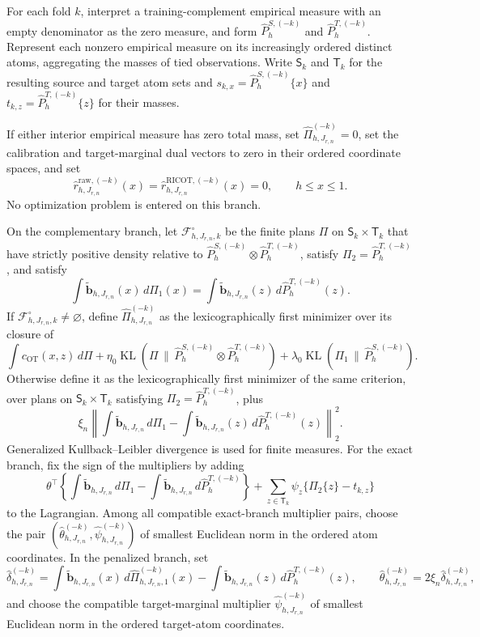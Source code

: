 For each fold \(k\), interpret a training-complement empirical measure with an empty denominator as the zero measure, and form \(\widehat P^{S,(-k)}_h\) and \(\widehat P^{T,(-k)}_h\). Represent each nonzero empirical measure on its increasingly ordered distinct atoms, aggregating the masses of tied observations. Write \(\mathsf S_k\) and \(\mathsf T_k\) for the resulting source and target atom sets and \(s_{k,x}=\widehat P^{S,(-k)}_h\{x\}\) and \(t_{k,z}=\widehat P^{T,(-k)}_h\{z\}\) for their masses.

If either interior empirical measure has zero total mass, set \(\widehat\Pi^{(-k)}_{h,J_{r,n}}=0\), set the calibration and target-marginal dual vectors to zero in their ordered coordinate spaces, and set
\[
\widehat r^{\mathrm{raw},(-k)}_{h,J_{r,n}}(x)=
\widehat r^{\mathrm{RICOT},(-k)}_{h,J_{r,n}}(x)=0,
\qquad h\le x\le1.
\]
No optimization problem is entered on this branch.

On the complementary branch, let \(\mathcal F^\circ_{h,J_{r,n},k}\) be the finite plans \(\Pi\) on \(\mathsf S_k\times\mathsf T_k\) that have strictly positive density relative to \(\widehat P^{S,(-k)}_h\otimes\widehat P^{T,(-k)}_h\), satisfy \(\Pi_2=\widehat P^{T,(-k)}_h\), and satisfy
\[
\int\widetilde{\mathbf b}_{h,J_{r,n}}(x)\,d\Pi_1(x)=\int\widetilde{\mathbf b}_{h,J_{r,n}}(z)\,d\widehat P^{T,(-k)}_h(z).
\]
If \(\mathcal F^\circ_{h,J_{r,n},k}\ne\varnothing\), define \(\widehat\Pi^{(-k)}_{h,J_{r,n}}\) as the lexicographically first minimizer over its closure of
\[
\int c_{\mathrm{OT}}(x,z)\,d\Pi+\eta_0\operatorname{KL}(\Pi\,\|\,\widehat P^{S,(-k)}_h\otimes\widehat P^{T,(-k)}_h)+\lambda_0\operatorname{KL}(\Pi_1\,\|\,\widehat P^{S,(-k)}_h).
\]
Otherwise define it as the lexicographically first minimizer of the same criterion, over plans on \(\mathsf S_k\times\mathsf T_k\) satisfying \(\Pi_2=\widehat P^{T,(-k)}_h\), plus
\[
\xi_n\left\|\int\widetilde{\mathbf b}_{h,J_{r,n}}\,d\Pi_1-\int\widetilde{\mathbf b}_{h,J_{r,n}}(z)\,d\widehat P^{T,(-k)}_h(z)\right\|_2^2.
\]
Generalized Kullback--Leibler divergence is used for finite measures. For the exact branch, fix the sign of the multipliers by adding
\[
\theta^\top\left\{\int\widetilde{\mathbf b}_{h,J_{r,n}}\,d\Pi_1-\int\widetilde{\mathbf b}_{h,J_{r,n}}\,d\widehat P^{T,(-k)}_h\right\}
+\sum_{z\in\mathsf T_k}\psi_z\{\Pi_2\{z\}-t_{k,z}\}
\]
to the Lagrangian. Among all compatible exact-branch multiplier pairs, choose the pair \((\widehat\theta^{(-k)}_{h,J_{r,n}},\widehat\psi^{(-k)}_{h,J_{r,n}})\) of smallest Euclidean norm in the ordered atom coordinates. In the penalized branch, set
\[
\widehat\delta^{(-k)}_{h,J_{r,n}}=
\int\widetilde{\mathbf b}_{h,J_{r,n}}(x)\,d\widehat\Pi^{(-k)}_{h,J_{r,n},1}(x)
-\int\widetilde{\mathbf b}_{h,J_{r,n}}(z)\,d\widehat P^{T,(-k)}_h(z),
\qquad
\widehat\theta^{(-k)}_{h,J_{r,n}}=2\xi_n\widehat\delta^{(-k)}_{h,J_{r,n}},
\]
and choose the compatible target-marginal multiplier \(\widehat\psi^{(-k)}_{h,J_{r,n}}\) of smallest Euclidean norm in the ordered target-atom coordinates.

